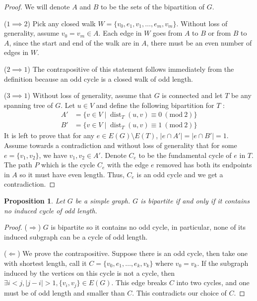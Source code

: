 \documentclass{tufte-handout}
\newtheorem{prop}[thm]{Proposition}
\theoremstyle{definition}
\theoremstyle{remark}
\newcommand{\Mod}[1]{\ (\text{mod}\ #1)}
\DeclareMathOperator{\dist}{dist}
\begin{document}
\begin{proof} We will denote $A$ and $B$ to be the sets of the bipartition of $G$.

	($1 \implies 2$) Pick any closed walk $W = \{v_0, e_1, v_1, \dots, e_m, v_m\}$. Without loss of generality, assume $v_0 = v_m \in A$. Each edge in $W$ goes from $A$ to $B$ or from $B$ to $A$, since the start and end of the walk are in $A$, there must be an even number of edges in $W$.
	
	($2 \implies 1$) The contrapositive of this statement follows immediately from the definition because an odd cycle is a closed walk of odd length.
	
	($3 \implies 1$) Without loss of generality, assume that $G$ is connected and let $T$ be any spanning tree of $G$. Let $u \in V$ and define the following bipartition for $T$ : \begin{align*}
		A' &= \{v \in V \mid \dist_T(u,v) \equiv 0 \Mod{2}\}\\ 
		B' &= \{v \in V \mid \dist_T(u,v) \equiv 1 \Mod{2}\}
	\end{align*}
	It is left to prove that for any $e \in E(G) \setminus E(T)$, $|e \cap A'| = |e \cap B'| = 1$. Assume towards a contradiction and without loss of generality that for some $e = \{v_1, v_2\}$, we have $v_1, v_2 \in A'$. Denote $C_e$ to be the fundamental cycle of $e$ in $T$. The path $P$ which is the cycle $C_e$ with the edge $e$ removed has both its endpoints in $A$ so it must have even length. Thus, $C_e$ is an odd cycle and we get a contradiction.
\end{proof}
\begin{prop}
	Let $G$ be a simple graph. $G$ is bipartite if and only if it contains no induced cycle of odd length.
\end{prop}
\begin{proof}
	($\Rightarrow$) $G$ is bipartite so it contains no odd cycle, in particular, none of its induced subgraph can be a cycle of odd length.
	
	($\Leftarrow$) We prove the contrapositive. Suppose there is an odd cycle, then take one with shortest length, call it $C = \{v_0,e_1,\dots, e_k,v_k\}$ where $v_0 = v_k$. If the subgraph induced by the vertices on this cycle is not a cycle, then $\exists i<j, |j-i| > 1, \{v_i, v_j\} \in E(G)$. This edge breaks $C$ into two cycles, and one must be of odd length and smaller than $C$. This contradicts our choice of $C$.
\end{proof}
\end{document}
